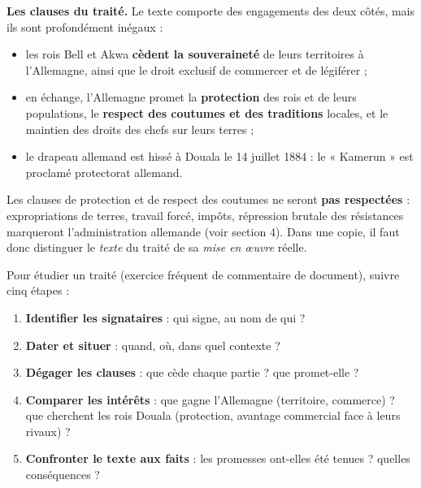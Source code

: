 \documentclass[11pt]{article}
\newcommand{\cle}[1]{{\popxbold\color{popdark}#1}}
\begin{document}
\textbf{Les clauses du traité.} Le texte comporte des engagements des deux côtés, mais ils sont profondément inégaux :
\begin{itemize}
\item les rois Bell et Akwa \textbf{cèdent la souveraineté} de leurs territoires à l'Allemagne, ainsi que le droit exclusif de commercer et de légiférer ;
\item en échange, l'Allemagne promet la \textbf{protection} des rois et de leurs populations, le \textbf{respect des coutumes et des traditions} locales, et le maintien des droits des chefs sur leurs terres ;
\item le drapeau allemand est hissé à Douala le 14 juillet 1884 : le « \cle{Kamerun} » est proclamé protectorat allemand.
\end{itemize}

\begin{attention}
Les clauses de protection et de respect des coutumes ne seront \textbf{pas respectées} : expropriations de terres, travail forcé, impôts, répression brutale des résistances marqueront l'administration allemande (voir section 4). Dans une copie, il faut donc distinguer le \emph{texte} du traité de sa \emph{mise en œuvre} réelle.
\end{attention}

\begin{methode}
Pour étudier un traité (exercice fréquent de commentaire de document), suivre cinq étapes :
\begin{enumerate}
\item \textbf{Identifier les signataires} : qui signe, au nom de qui ?
\item \textbf{Dater et situer} : quand, où, dans quel contexte ?
\item \textbf{Dégager les clauses} : que cède chaque partie ? que promet-elle ?
\item \textbf{Comparer les intérêts} : que gagne l'Allemagne (territoire, commerce) ? que cherchent les rois Douala (protection, avantage commercial face à leurs rivaux) ?
\item \textbf{Confronter le texte aux faits} : les promesses ont-elles été tenues ? quelles conséquences ?
\end{enumerate}
\end{methode}
\end{document}
